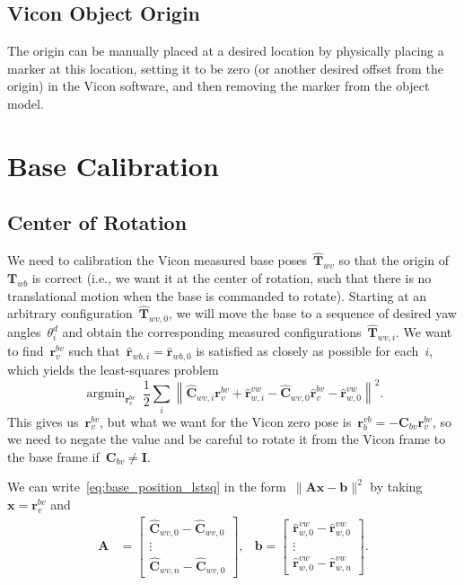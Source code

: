 \documentclass{article}
\DeclareMathOperator*{\argmin}{argmin}
\begin{document}
\subsection{Vicon Object Origin}

The origin can be manually placed at a desired location by physically placing a marker at
this location, setting it to be zero (or another desired offset from the
origin) in the Vicon software, and then removing the marker from the object model.

\section{Base Calibration}

\subsection{Center of Rotation}

We need to calibration the Vicon measured base poses~$\hat{\bm{T}}_{wv}$ so
that the origin of~$\bm{T}_{wb}$ is correct (i.e., we want it at the center of
rotation, such that there is no translational motion when the base is commanded
to rotate). Starting at an arbitrary configuration~$\hat{\bm{T}}_{wv,0}$, we
will move the base to a sequence of desired yaw angles~$\theta^d_i$ and obtain
the corresponding measured configurations~$\hat{\bm{T}}_{wv,i}$. We want to
find~$\bm{r}^{bv}_v$ such that~$\hat{\bm{r}}_{wb,i} = \hat{\bm{r}}_{wb,0}$ is
satisfied as closely as possible for each~$i$, which yields the least-squares
problem
\begin{equation}\label{eq:base_position_lstsq}
  \argmin_{\bm{r}^{bv}_v}\ \frac{1}{2}\sum_i\left\|\hat{\bm{C}}_{wv,i}\bm{r}^{bv}_v + \hat{\bm{r}}^{vw}_{w,i} - \hat{\bm{C}}_{wv,0}\hat{\bm{r}}^{bv}_{v} - \hat{\bm{r}}^{vw}_{w,0}\right\|^2.
\end{equation}
This gives us~$\bm{r}^{bv}_v$, but what we want for the Vicon zero pose is~$\bm{r}^{vb}_b=-\bm{C}_{bv}\bm{r}^{bv}_v$, so we need to negate the value and be careful to rotate it from the Vicon frame to the base frame if~$\bm{C}_{bv}\neq\bm{I}$.

We can write~\eqref{eq:base_position_lstsq} in the form~$\|\bm{A}\bm{x}-\bm{b}\|^2$ by taking~$\bm{x}=\bm{r}^{bv}_v$ and
\begin{align*}
  \bm{A} &= \begin{bmatrix}
    \hat{\bm{C}}_{wv,0} - \hat{\bm{C}}_{wv,0} \\ \vdots \\ \hat{\bm{C}}_{wv,n} - \hat{\bm{C}}_{wv,0}
  \end{bmatrix}, & \bm{b} = \begin{bmatrix}
  \hat{\bm{r}}^{vw}_{w,0} - \hat{\bm{r}}^{vw}_{w,0} \\ \vdots \\ \hat{\bm{r}}^{vw}_{w,0} - \hat{\bm{r}}^{vw}_{w,n}
  \end{bmatrix}.
\end{align*}
\end{document}
